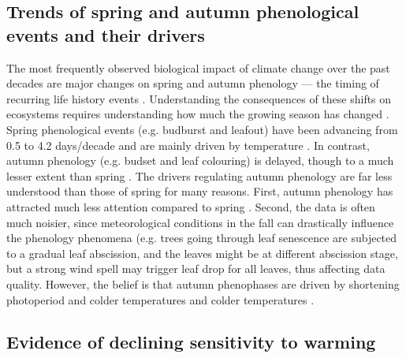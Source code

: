 \documentclass{article}
\begin{document}
\subsection {Trends of spring and autumn phenological events and their drivers}
The most frequently observed biological impact of climate change over the past decades are major changes on spring and autumn phenology --- the timing of recurring life history events \cite{parmesan_globally_2003,cleland_shifting_2007,lieth_phenology_1974,woolway_phenological_2021,menzel_european_2006}. Understanding the consequences of these shifts on ecosystems requires understanding how much the growing season has changed \cite{duputie_phenological_2015}. Spring phenological events (e.g. budburst and leafout) have been advancing from 0.5 \cite{wolfe_climate_2005} to 4.2 days/decade \cite{chmielewski_response_2001,fu_recent_2014} and are mainly driven by temperature \cite{chuine_why_2010,cleland_shifting_2007,penuelas_responses_2001}. In contrast, autumn phenology (e.g. budset and leaf colouring) is delayed, though to a much lesser extent than spring \cite{gallinat_autumn_2015,jeong_macroscale_2014}. The drivers regulating autumn phenology are far less understood than those of spring for many reasons. First, autumn phenology has attracted much less attention compared to spring \cite{piao_plant_2019}. Second, the data is often much noisier, since meteorological conditions in the fall can drastically influence the phenology phenomena (e.g. trees going through leaf senescence are subjected to a gradual leaf abscission, and the leaves might be at different abscission stage, but a strong wind spell may trigger leaf drop for all leaves, thus affecting data quality. However, the belief is that autumn phenophases are driven by shortening photoperiod and colder temperatures \cite{cooke_dynamic_2012,flynn_temperature_2018,korner_phenology_2010} and colder temperatures \cite{cooke_dynamic_2012,delpierre_temperate_2016}. 

\subsection{Evidence of declining sensitivity to warming}
\end{document}
